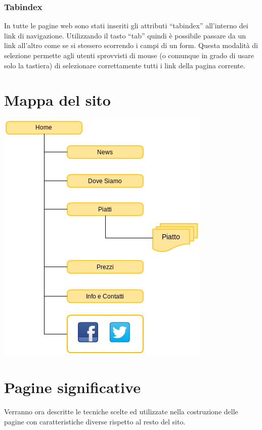 \documentclass[10pt,a4paper,onecolumn]{article}
\begin{document}
\subsubsection{Tabindex}

In tutte le pagine web sono stati inseriti gli attributi ``tabindex'' all'interno dei link di navigazione. Utilizzando il tasto ``tab'' quindi è possibile passare da un link all'altro come se si stessero scorrendo i campi di un form. Questa modalità di selezione permette agli utenti sprovvisti di mouse (o comunque in grado di usare solo la tastiera) di selezionare correttamente tutti i link della pagina corrente.

\clearpage
\section{Mappa del sito}
\includegraphics[width=.9\textwidth]{mappasito.png}


\clearpage

\section{Pagine significative}

Verranno ora descritte le tecniche scelte ed utilizzate nella costruzione delle pagine con caratteristiche diverse rispetto al resto del sito.
\end{document}
